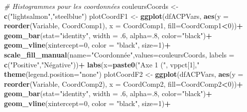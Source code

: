 \documentclass[
  11pt,
  french,
]{book}
\makeatletter
\newenvironment{Shaded}{\begin{snugshade}}{\end{snugshade}}
\newcommand{\CommentTok}[1]{\textcolor[rgb]{0.56,0.35,0.01}{\textit{#1}}}
\newcommand{\DataTypeTok}[1]{\textcolor[rgb]{0.13,0.29,0.53}{#1}}
\newcommand{\DecValTok}[1]{\textcolor[rgb]{0.00,0.00,0.81}{#1}}
\newcommand{\FloatTok}[1]{\textcolor[rgb]{0.00,0.00,0.81}{#1}}
\newcommand{\KeywordTok}[1]{\textcolor[rgb]{0.13,0.29,0.53}{\textbf{#1}}}
\newcommand{\NormalTok}[1]{#1}
\newcommand{\OperatorTok}[1]{\textcolor[rgb]{0.81,0.36,0.00}{\textbf{#1}}}
\newcommand{\StringTok}[1]{\textcolor[rgb]{0.31,0.60,0.02}{#1}}
\newenvironment{kframe}{%
\medskip{}
\setlength{\fboxsep}{.8em}
 \def\at@end@of@kframe{}%
 \ifinner\ifhmode%
  \def\at@end@of@kframe{\end{minipage}}%
  \begin{minipage}{\columnwidth}%
 \fi\fi%
 \def\FrameCommand##1{\hskip\@totalleftmargin \hskip-\fboxsep
 \colorbox{shadecolor}{##1}\hskip-\fboxsep
     \hskip-\linewidth \hskip-\@totalleftmargin \hskip\columnwidth}%
 \MakeFramed {\advance\hsize-\width
   \@totalleftmargin\z@ \linewidth\hsize
   \@setminipage}}%
 {\par\unskip\endMakeFramed%
 \at@end@of@kframe}
\renewenvironment{Shaded}{\begin{kframe}}{\end{kframe}}
\makeatother
\begin{document}
\begin{Shaded}
\begin{Highlighting}[]
\CommentTok{# Histogrammes pour les coordonnées}
\NormalTok{couleursCoords <-}\StringTok{ }\KeywordTok{c}\NormalTok{(}\StringTok{"lightsalmon"}\NormalTok{,}\StringTok{"steelblue"}\NormalTok{)}
\NormalTok{plotCoordF1 <-}\StringTok{ }\KeywordTok{ggplot}\NormalTok{(dfACPVars,}
                      \KeywordTok{aes}\NormalTok{(}\DataTypeTok{y =} \KeywordTok{reorder}\NormalTok{(Variable, CoordComp1),}
                          \DataTypeTok{x =}\NormalTok{ CoordComp1, }\DataTypeTok{fill=}\NormalTok{CoordComp1}\OperatorTok{<}\DecValTok{0}\NormalTok{))}\OperatorTok{+}
\StringTok{  }\KeywordTok{geom_bar}\NormalTok{(}\DataTypeTok{stat=}\StringTok{"identity"}\NormalTok{, }\DataTypeTok{width =} \FloatTok{.6}\NormalTok{, }\DataTypeTok{alpha=}\NormalTok{.}\DecValTok{8}\NormalTok{, }\DataTypeTok{color=}\StringTok{"black"}\NormalTok{)}\OperatorTok{+}
\StringTok{  }\KeywordTok{geom_vline}\NormalTok{(}\DataTypeTok{xintercept=}\DecValTok{0}\NormalTok{, }\DataTypeTok{color =} \StringTok{"black"}\NormalTok{, }\DataTypeTok{size=}\DecValTok{1}\NormalTok{)}\OperatorTok{+}
\StringTok{  }\KeywordTok{scale_fill_manual}\NormalTok{(}\DataTypeTok{name=}\StringTok{"Coordonnée"}\NormalTok{,}\DataTypeTok{values=}\NormalTok{couleursCoords,}
                    \DataTypeTok{labels =} \KeywordTok{c}\NormalTok{(}\StringTok{"Positive"}\NormalTok{,}\StringTok{"Négative"}\NormalTok{))}\OperatorTok{+}
\StringTok{  }\KeywordTok{labs}\NormalTok{(}\DataTypeTok{x=}\KeywordTok{paste0}\NormalTok{(}\StringTok{"Axe 1 ("}\NormalTok{, vppct[}\DecValTok{1}\NormalTok{],}\StringTok{"%
\StringTok{  }\KeywordTok{theme}\NormalTok{(}\DataTypeTok{legend.position=}\StringTok{"none"}\NormalTok{)}
\NormalTok{plotCoordF2 <-}\StringTok{ }\KeywordTok{ggplot}\NormalTok{(dfACPVars,}
                      \KeywordTok{aes}\NormalTok{(}\DataTypeTok{y =} \KeywordTok{reorder}\NormalTok{(Variable, CoordComp2),}
                          \DataTypeTok{x =}\NormalTok{ CoordComp2, }\DataTypeTok{fill=}\NormalTok{CoordComp2}\OperatorTok{<}\DecValTok{0}\NormalTok{))}\OperatorTok{+}
\StringTok{  }\KeywordTok{geom_bar}\NormalTok{(}\DataTypeTok{stat=}\StringTok{"identity"}\NormalTok{, }\DataTypeTok{width =} \FloatTok{.6}\NormalTok{, }\DataTypeTok{alpha=}\NormalTok{.}\DecValTok{8}\NormalTok{, }\DataTypeTok{color=}\StringTok{"black"}\NormalTok{)}\OperatorTok{+}
\StringTok{  }\KeywordTok{geom_vline}\NormalTok{(}\DataTypeTok{xintercept=}\DecValTok{0}\NormalTok{, }\DataTypeTok{color =} \StringTok{"black"}\NormalTok{, }\DataTypeTok{size=}\DecValTok{1}\NormalTok{)}\OperatorTok{+}
}
\end{Highlighting}
\end{Shaded}
\end{document}
